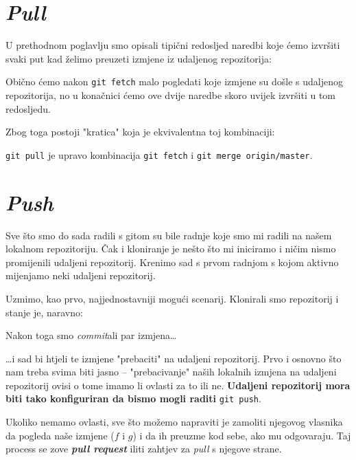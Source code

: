 

\section*{\emph{Pull}}

U prethodnom poglavlju smo opisali tipični redosljed naredbi koje ćemo izvršiti svaki put kad želimo preuzeti izmjene iz udaljenog repozitorija:


Obično ćemo nakon \verb+git fetch+ malo pogledati koje izmjene su došle s udaljenog repozitorija, no u konačnici ćemo ove dvije naredbe skoro uvijek izvršiti u tom redosljedu.

Zbog toga postoji "kratica" koja je ekvivalentna toj kombinaciji:


\verb+git pull+ je upravo kombinacija \verb+git fetch+ i \verb+git merge origin/master+.

\section*{\emph{Push}}

Sve što smo do sada radili s gitom su bile radnje koje smo mi radili na našem lokalnom repozitoriju.
Čak i kloniranje je nešto što mi iniciramo i ničim nismo promijenili udaljeni repozitorij.
Krenimo sad s prvom radnjom s kojom aktivno mijenjamo neki udaljeni repozitorij.

Uzmimo, kao prvo, najjednostavniji mogući scenarij.
Klonirali smo repozitorij i stanje je, naravno:



Nakon toga smo \emph{commit}ali par izmjena\dots



\dots{}i sad bi htjeli te izmjene "prebaciti" na udaljeni repozitorij.
Prvo i osnovno što nam treba svima biti jasno -- "prebacivanje" naših lokalnih izmjena na udaljeni repozitorij ovisi o tome imamo li ovlasti za to ili ne.
\textbf{Udaljeni repozitorij mora biti tako konfiguriran da bismo mogli raditi} \verb+git push+.

Ukoliko nemamo ovlasti, sve što možemo napraviti je zamoliti njegovog vlasnika da pogleda naše izmjene ($f$ i $g$) i da ih preuzme kod sebe, ako mu odgovaraju.
Taj process se zove \textbf{\emph{pull request}} iliti zahtjev za \emph{pull} s njegove strane.

